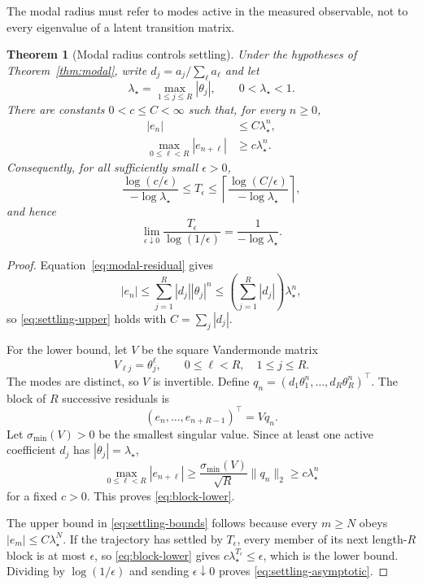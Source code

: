 \documentclass[10pt,twocolumn]{article}
\newtheorem{theorem}{Theorem}
\begin{document}
The modal radius must refer to modes active in the measured observable, not to
every eigenvalue of a latent transition matrix.

\begin{theorem}[Modal radius controls settling]\label{thm:settling}
Under the hypotheses of Theorem~\ref{thm:modal}, write
$d_j=a_j/\sum_\ell a_\ell$ and let
\begin{equation}\label{eq:modal-radius}
 \lambda_\star=\max_{1\leq j\leq R}|\theta_j|,
 \qquad 0<\lambda_\star<1.
\end{equation}
There are constants $0<c\leq C<\infty$ such that, for every $n\geq0$,
\begin{align}
 |e_n|&\leq C\lambda_\star^n,\label{eq:settling-upper}\\
 \max_{0\leq \ell<R}|e_{n+\ell}|
 &\geq c\lambda_\star^n.\label{eq:block-lower}
\end{align}
Consequently, for all sufficiently small $\epsilon>0$,
\begin{equation}\label{eq:settling-bounds}
 \frac{\log(c/\epsilon)}{-\log\lambda_\star}
 \leq T_\epsilon
 \leq
 \left\lceil
 \frac{\log(C/\epsilon)}{-\log\lambda_\star}
 \right\rceil,
\end{equation}
and hence
\begin{equation}\label{eq:settling-asymptotic}
 \lim_{\epsilon\downarrow0}
 \frac{T_\epsilon}{\log(1/\epsilon)}
 =
 \frac{1}{-\log\lambda_\star}.
\end{equation}
\end{theorem}

\begin{proof}
Equation~\eqref{eq:modal-residual} gives
\[
 |e_n|
 \leq \sum_{j=1}^{R}|d_j||\theta_j|^n
 \leq
 \left(\sum_{j=1}^{R}|d_j|\right)\lambda_\star^n,
\]
so \eqref{eq:settling-upper} holds with
$C=\sum_j|d_j|$.

For the lower bound, let $V$ be the square Vandermonde matrix
\[
 V_{\ell j}=\theta_j^\ell,
 \qquad 0\leq\ell<R,\quad 1\leq j\leq R.
\]
The modes are distinct, so $V$ is invertible.  Define
$q_n=(d_1\theta_1^n,\ldots,d_R\theta_R^n)^\top$.  The block of $R$
successive residuals is
\[
 (e_n,\ldots,e_{n+R-1})^\top=Vq_n.
\]
Let $\sigma_{\min}(V)>0$ be the smallest singular value.  Since at least one
active coefficient $d_j$ has $|\theta_j|=\lambda_\star$,
\[
 \max_{0\leq\ell<R}|e_{n+\ell}|
 \geq
 \frac{\sigma_{\min}(V)}{\sqrt R}\|q_n\|_2
 \geq c\lambda_\star^n
\]
for a fixed $c>0$.  This proves \eqref{eq:block-lower}.

The upper bound in \eqref{eq:settling-bounds} follows because every $m\geq N$
obeys $|e_m|\leq C\lambda_\star^N$.  If the trajectory has settled by
$T_\epsilon$, every member of its next length-$R$ block is at most $\epsilon$,
so \eqref{eq:block-lower} gives
$c\lambda_\star^{T_\epsilon}\leq\epsilon$, which is the lower bound.
Dividing by $\log(1/\epsilon)$ and sending $\epsilon\downarrow0$ proves
\eqref{eq:settling-asymptotic}.
\end{proof}
\end{document}
